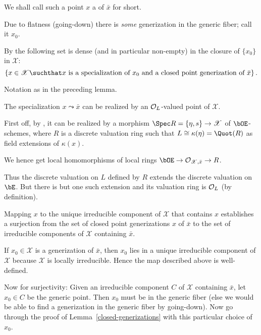 \documentclass[a4paper]{scrartcl} %
\numberwithin{equation}{section}
\begin{document}
\begin{Definition}\label{def-cpg}
  We shall call such a point $x$ a  of $\bar x$ for short.
\end{Definition}


\begin{Proof}
  Due to flatness (going-down) there is \emph{some} generization in the generic fiber; call it $x_0$.

  By  the following set is dense (and in particular non-empty) in the closure of $\{x_0\}$ in $\mathcal{X}$:
  \begin{equation*}
    \left\{ x\in\mathscr{X} \suchthat x\text{ is a specialization of } x_0\text{ and a closed point generization of } \bar x \right\}.
  \end{equation*}
\end{Proof}


\begin{Lemma}\label{closed-generizations-realization}
  Notation as in the preceding lemma.

  The specialization $x\leadsto \bar x$ can be realized by an ${\cal O}_L$-valued point of $\mathscr{X}$.
\end{Lemma}

\begin{Proof}
  First off, by \cite[.9]{EGA2}, it can be realized by a morphism $\Spec R=\{\eta,s\}\to\mathscr{X}$ of $\bOE$-schemes, where $R$ is a discrete valuation ring such that $L\cong\kappa(\eta)=\Quot(R)$ as field extensions of $\kappa(x)$.

  We hence get local homomorphisms of local rings $\bOE\to{\cal O}_{\mathscr{X},\bar x}\to R$.

  Thus the discrete valuation on $L$ defined by $R$ extends the discrete valuation on $\bE$. But there is but one such extension and its valuation ring is ${\cal O}_L$ (by definition).
\end{Proof}


\begin{Lemma}
  Mapping $x$ to the unique irreducible component of $\mathscr{X}$ that contains $x$ establishes a surjection from the set of closed point generizations $x$ of $\bar x$ to the set of irreducible components of $\mathscr{X}$ containing $\bar x$.
\end{Lemma}

\begin{Proof}
  If $x_0\in\mathcal{X}$ is a generization of $\bar x$, then $x_0$ lies in a unique irreducible component of $\mathscr{X}$ because $\mathcal{X}$ is locally irreducible. Hence the map described above is well-defined.

  Now for surjectivity: Given an irreducible component $C$ of $\mathscr{X}$ containing $\bar x$, let $x_0\in C$ be the generic point. Then $x_0$ must be in the generic fiber (else we would be able to find a generization in the generic fiber by going-down). Now go through the proof of Lemma~\ref{closed-generizations} with this particular choice of $x_0$.
\end{Proof}
\end{document}
